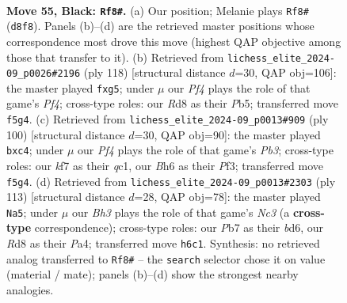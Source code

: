 \documentclass[11pt]{article}
\begin{document}
\clearpage

\begin{figure}[p]\centering
\begin{subfigure}{0.46\textwidth}\centering
\resizebox{\linewidth}{!}{%
\newchessgame
\chessboard[
  setfen={3r4/1p3K1k/6pb/5p1p/P5P1/7P/4r3/8 b - - 2 55},
  showmover=false,
  pgfstyle=straightmove, color=movearrow, markmove={d8-f8}
]}
\caption{}
\end{subfigure}\hfill
\begin{subfigure}{0.46\textwidth}\centering
\resizebox{\linewidth}{!}{%
\newchessgame
\chessboard[
  setfen={4B3/8/1p5p/1P3pp1/3k1P1P/6P1/6K1/8 w - - 0 60},
  showmover=false,
  pgfstyle=straightmove, color=movearrow, markmove={f4-g5}
]}
\caption{}
\end{subfigure}
\\[4pt]
\begin{subfigure}{0.46\textwidth}\centering
\resizebox{\linewidth}{!}{%
\newchessgame
\chessboard[
  setfen={8/7k/p7/1p2P3/P1p3P1/1P3P2/2P1K3/2q5 w - - 0 51},
  showmover=false,
  pgfstyle=straightmove, color=movearrow, markmove={b3-c4}
]}
\caption{}
\end{subfigure}\hfill
\begin{subfigure}{0.46\textwidth}\centering
\resizebox{\linewidth}{!}{%
\newchessgame
\chessboard[
  setfen={8/7p/2nB2p1/1k3p1P/p5P1/2K2P2/8/8 b - - 0 57},
  showmover=false,
  pgfstyle=straightmove, color=movearrow, markmove={c6-a5}
]}
\caption{}
\end{subfigure}
\caption{\textbf{Move 55, Black: \texttt{Rf8\#}.} (a) Our position; Melanie plays \texttt{Rf8\#} (\texttt{d8f8}). Panels (b)--(d) are the retrieved master positions whose correspondence most drove this move (highest QAP objective among those that transfer to it). (b) Retrieved from \texttt{lichess\_elite\_2024-09\_p0026\#2196} (ply 118) [structural distance $d$=30, QAP obj=106]: the master played \texttt{fxg5}; under $\mu$ our \emph{Pf4} plays the role of that game's \emph{Pf4}; cross-type roles: our \emph{R}d8 as their \emph{P}b5; transferred move \texttt{f5g4}. (c) Retrieved from \texttt{lichess\_elite\_2024-09\_p0013\#909} (ply 100) [structural distance $d$=30, QAP obj=90]: the master played \texttt{bxc4}; under $\mu$ our \emph{Pf4} plays the role of that game's \emph{Pb3}; cross-type roles: our \emph{k}f7 as their \emph{q}c1, our \emph{B}h6 as their \emph{P}f3; transferred move \texttt{f5g4}. (d) Retrieved from \texttt{lichess\_elite\_2024-09\_p0013\#2303} (ply 113) [structural distance $d$=28, QAP obj=78]: the master played \texttt{Na5}; under $\mu$ our \emph{Bh3} plays the role of that game's \emph{Nc3} (a \textbf{cross-type} correspondence); cross-type roles: our \emph{P}b7 as their \emph{b}d6, our \emph{R}d8 as their \emph{P}a4; transferred move \texttt{h6c1}. Synthesis: no retrieved analog transferred to \texttt{Rf8\#} -- the \texttt{search} selector chose it on value (material / mate); panels (b)--(d) show the strongest nearby analogies.}
\label{fig:thought-m109}
\end{figure}
\end{document}
